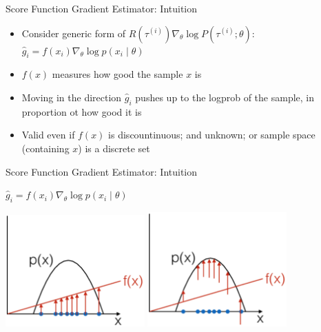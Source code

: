 \begin{frame}[c]{Score Function Gradient Estimator: Intuition}
	
	\begin{itemize}
		\item Consider generic form of $R(\tau^{(i)}) \nabla_\theta \log P(\tau^{(i)}; \theta)$:\\
		$\hat{g}_i = f(x_i) \nabla_\theta \log p(x_i \mid \theta)$
		\item $f(x)$ measures how good the sample $x$ is
		\item Moving in the direction $\hat{g}_i$ pushes up to the logprob of the sample, in proportion ot how good it is
		\item Valid even if $f(x)$ is discountinuous; and unknown; or sample space (containing $x$) is a discrete set
	\end{itemize}
	
\end{frame}
\begin{frame}[c]{Score Function Gradient Estimator: Intuition}
	

\centering
$\hat{g}_i = f(x_i) \nabla_\theta \log p(x_i \mid \theta)$
\bigskip

\includegraphics[width=0.4\textwidth]{images/scoring_function_1.png}
\pause
\includegraphics[width=0.4\textwidth]{images/scoring_function_2.png}
	
\end{frame}
